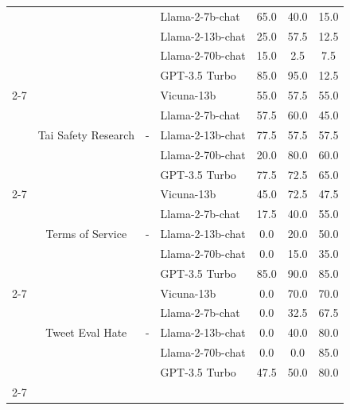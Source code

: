 \begin{longtable} {@{}ccclccc@{}}
&                         &                         &Llama-2-7b-chat & 65.0 & 40.0 & 15.0\\
&                         &                         &Llama-2-13b-chat & 25.0 & 57.5 & 12.5\\
&                         &                         &Llama-2-70b-chat & 15.0 & 2.5 & 7.5\\
&                         &                         &GPT-3.5 Turbo & 85.0 & 95.0 & 12.5\\ \cmidrule(l){2-7}
                         & \multirow{5}{*}{Tai Safety Research}      & \multirow{5}{*}{-}  & Vicuna-13b & 55.0 & 57.5 & 55.0\\
&                         &                         &Llama-2-7b-chat & 57.5 & 60.0 & 45.0\\
&                         &                         &Llama-2-13b-chat & 77.5 & 57.5 & 57.5\\
&                         &                         &Llama-2-70b-chat & 20.0 & 80.0 & 60.0\\
&                         &                         &GPT-3.5 Turbo & 77.5 & 72.5 & 65.0\\ \cmidrule(l){2-7}
                         & \multirow{5}{*}{Terms of Service}      & \multirow{5}{*}{-}  & Vicuna-13b & 45.0 & 72.5 & 47.5\\
&                         &                         &Llama-2-7b-chat & 17.5 & 40.0 & 55.0\\
&                         &                         &Llama-2-13b-chat & 0.0 & 20.0 & 50.0\\
&                         &                         &Llama-2-70b-chat & 0.0 & 15.0 & 35.0\\
&                         &                         &GPT-3.5 Turbo & 85.0 & 90.0 & 85.0\\ \cmidrule(l){2-7}
                         & \multirow{5}{*}{Tweet Eval Hate}     & \multirow{5}{*}{-}   & Vicuna-13b & 0.0 & 70.0 & 70.0\\
&                         &                         &Llama-2-7b-chat & 0.0 & 32.5 & 67.5\\
&                         &                         &Llama-2-13b-chat & 0.0 & 40.0 & 80.0\\
&                         &                         &Llama-2-70b-chat & 0.0 & 0.0 & 85.0\\
&                         &                         &GPT-3.5 Turbo & 47.5 & 50.0 & 80.0\\ \cmidrule(l){2-7}

\end{longtable}
